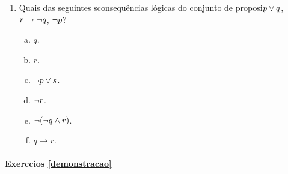 \begin{enumerate}[{\bf 1.}]
\item Quais das seguintes s\ao consequ\^encias l\'ogicas do conjunto de proposi\coes $p\vee q$, $r\to\lnot q$, $\lnot p$?
\begin{enumerate}[a)]
\item $q$.
\item $r$.
\item $\lnot p\vee s$.
\item $\lnot r$.
\item $\lnot(\lnot q\wedge r)$.
\item $q\to r$.
\end{enumerate}
\end{enumerate}
\paragraph{Exerc\ih cios \ref{demonstracao}}

